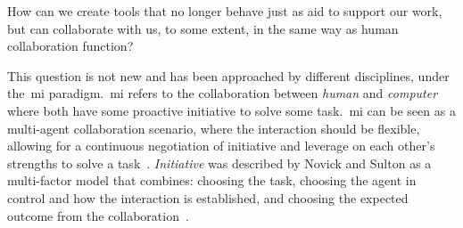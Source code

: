 


\begin{retQuestion}{}
    How can we create tools that no longer behave just as aid to support our work, but can collaborate with us, to some extent, in the same way as human collaboration function? 
\end{retQuestion}

This question is not new and has been approached by different disciplines, under the~\acrfull{mi} paradigm.~\acrshort{mi} refers to the collaboration between \emph{human} and \emph{computer} where both have some proactive initiative to solve some task.~\acrshort{mi} can be seen as a multi-agent collaboration scenario, where the interaction should be flexible, allowing for a continuous negotiation of initiative and leverage on each other's strengths to solve a task~\cite{Allen99-MIinteraction}. \emph{Initiative} was described by Novick and Sulton as a multi-factor model that combines: choosing the task, choosing the agent in control and how the interaction is established, and choosing the expected outcome from the collaboration~\cite{novick97-mixedInit}. 

